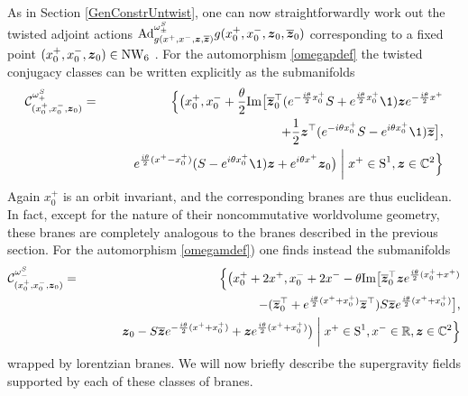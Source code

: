 As in Section \ref{GenConstrUntwist}, one can now straightforwardly work out the
twisted adjoint actions ${\rm Ad}^{\omega_\pm^S}_{g(x^+,x^-,{{\boldsymbol {z} }},\overline{{{\boldsymbol {z} }}}
  )} g(x^+_0,x^-_0,{{\boldsymbol {z} }}_0, \overline{{{\boldsymbol {z} }}}_0)$ corresponding to a fixed point
$(x_0^+,x_0^-,{{\boldsymbol {z} }}_0)\in\operatorname{NW}_6$ \cite{FS1,SF1}. For the automorphism
\eqref{omegapdef} the twisted conjugacy classes can be written explicitly as the
submanifolds
\begin{eqnarray}
  \label{conjclassgenp}
  \mathcal{C}^{\omega_+^S}_{(x_0^+,x^-_0,\mz_0)}&=&
  \Bigl\{\bigl(x^+_0 , x^-_0+\frac\theta2
    {\rm Im}\bigl[\overline{\mz}_0^{ \top} ( e^{-\frac{ i\theta}2 x_0^+}
    S+ e^{\frac{ i\theta}2 x_0^+} \1)\mz  e^{-\frac{ i\theta}2 x^+}\\\nn
    &&\qquad\qquad\qquad\qquad+\frac12 \mz^\top
    ( e^{- i\theta x_0^+} S- e^{ i\theta x_0^+} \1)
    \overline{\mz} \bigr] ,\\\nn
  &&\qquad e^{\frac{ i\theta}2 (x^+-x_0^+)} (S- e^{ i\theta x_0^+} \1)\mz+
      e^{ i\theta x^+} \mz_0 \bigr) \biggm| x^+\in\S^1 , \mz\in\C^2\Bigr\}
\end{eqnarray}
Again $x_0^+$ is an orbit invariant, and the corresponding branes are
thus euclidean. In fact, except for the nature of their noncommutative
worldvolume geometry, these branes are completely analogous to the
branes described in the previous section. For the automorphism
\eqref{omegamdef}) one finds instead the submanifolds
\begin{eqnarray}
  \label{conjclassgenm}
  \mathcal{C}^{\omega_-^S}_{(x_0^+,x^-_0,{{\boldsymbol {z} }}_0)}&=&
  \Bigl\{\bigl(x^+_0+2x^+ , x^-_0+2x^--\theta
  {\rm Im}\bigl[\overline{{{\boldsymbol {z} }}}{}_0^{ \top} {{\boldsymbol {z} }}  e^{\frac{ i\theta}2 
    (x_0^++x^+)}\\\nonumber
  &&\qquad\qquad\qquad\qquad\qquad\qquad\qquad-( \overline{{{\boldsymbol {z} }}}{}_0^{ \top}+
  e^{\frac{ i\theta}2 (x^++x_0^+)} \overline{{{\boldsymbol {z} }}}^{ \top}) S
  \overline{{{\boldsymbol {z} }}}  e^{\frac{ i\theta}2 (x^++x_0^+)}
  \bigr], \\\nonumber
  &&\qquad{{\boldsymbol {z} }}_0-S \overline{{{\boldsymbol {z} }}}  e^{-\frac{ i\theta}2 (x^++x_0^+)}+{{\boldsymbol {z} }} 
  e^{\frac{ i\theta}2 (x^++x_0^+)}\bigr) \biggm|
  x^+\in\operatorname{S}^1 , x^-\in{\mathbb R} , {{\boldsymbol {z} }}\in{\mathbb C}^2\Bigr\}
\end{eqnarray}
wrapped by lorentzian branes. We will now briefly describe the
supergravity fields supported by each of these classes of branes.

